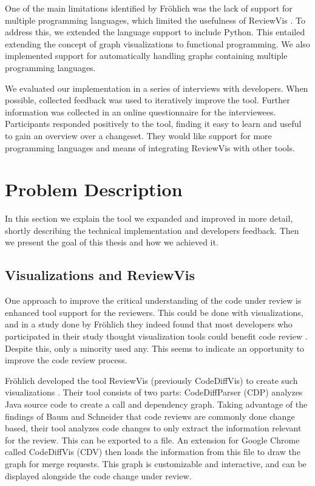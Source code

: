 \documentclass[a4paper,11pt,twoside]{article}
\theoremstyle{definition} %
\renewcommand{\cite}[1]{\citep{#1}}
\begin{document}
One of the main limitations identified by Fröhlich was the lack of support for multiple programming languages, which limited the usefulness of ReviewVis \cite{publication-20661}. To address this, we extended the language support to include Python. This entailed extending the concept of graph visualizations to functional programming. We also implemented support for automatically handling graphs containing multiple programming languages.

We evaluated our implementation in a series of interviews with developers. When possible, collected feedback was used to iteratively improve the tool. Further information was collected in an online questionnaire for the interviewees. Participants responded positively to the tool, finding it easy to learn and useful to gain an overview over a changeset. They would like support for more programming languages and means of integrating ReviewVis with other tools.

\newpage


\section{Problem Description} \label{Sec:ProblemDescription}
In this section we explain the tool we expanded and improved in more detail, shortly describing the technical implementation and developers feedback. Then we present the goal of this thesis and how we achieved it.

\subsection{Visualizations and ReviewVis}  \label{SubSec:VisualizationsAndReviewVis}
One approach to improve the critical understanding of the code under review is enhanced tool support for the reviewers. This could be done with visualizations, and in a study done by Fröhlich they indeed found that most developers who participated in their study thought visualization tools could benefit code review \cite{publication-20661}. Despite this, only a minority used any. This seems to indicate an opportunity to improve the code review process. 

Fröhlich developed the tool ReviewVis (previously CodeDiffVis) to create such visualizations \cite{publication-20661}. Their tool consists of two parts: CodeDiffParser (CDP) analyzes Java source code to create a call and dependency graph. Taking advantage of the findings of Baum and Schneider that code reviews are commonly done change based, their tool analyzes code changes to only extract the information relevant for the review. This can be exported to a file. An extension for Google Chrome called CodeDiffVis (CDV) then loads the information from this file to draw the graph for merge requests. This graph is customizable and interactive, and can be displayed alongside the code change under review. 
\end{document}
